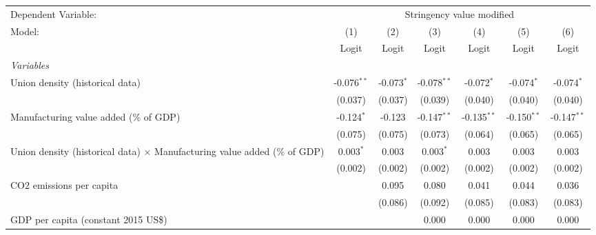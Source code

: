 
\begingroup
\centering
\begin{tabular}{lcccccc}
   \toprule
   Dependent Variable: & \multicolumn{6}{c}{Stringency value modified}\\
   Model:                                                                           & (1)           & (2)          & (3)           & (4)           & (5)           & (6)\\  
                                                                                    &  Logit        & Logit        & Logit         & Logit         & Logit         & Logit\\  
   \midrule
   \emph{Variables}\\
   Union density (historical data)                                                  & -0.076$^{**}$ & -0.073$^{*}$ & -0.078$^{**}$ & -0.072$^{*}$  & -0.074$^{*}$  & -0.074$^{*}$\\   
                                                                                    & (0.037)       & (0.037)      & (0.039)       & (0.040)       & (0.040)       & (0.040)\\   
   Manufacturing value added (\% of GDP)                                            & -0.124$^{*}$  & -0.123       & -0.147$^{**}$ & -0.135$^{**}$ & -0.150$^{**}$ & -0.147$^{**}$\\   
                                                                                    & (0.075)       & (0.075)      & (0.073)       & (0.064)       & (0.065)       & (0.065)\\   
   Union density (historical data) $\times$ Manufacturing value added (\% of GDP)   & 0.003$^{*}$   & 0.003        & 0.003$^{*}$   & 0.003         & 0.003         & 0.003\\   
                                                                                    & (0.002)       & (0.002)      & (0.002)       & (0.002)       & (0.002)       & (0.002)\\   
   CO2 emissions per capita                                                         &               & 0.095        & 0.080         & 0.041         & 0.044         & 0.036\\   
                                                                                    &               & (0.086)      & (0.092)       & (0.085)       & (0.083)       & (0.083)\\   
   GDP per capita (constant 2015 US\$)                                              &               &              & 0.000         & 0.000         & 0.000         & 0.000\\   

\end{tabular}
